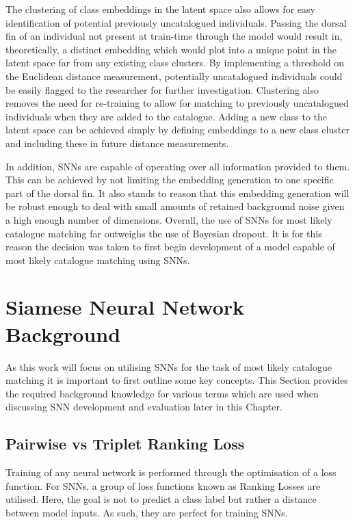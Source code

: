 The clustering of class embeddings in the latent space also allows for easy identification of potential previously uncatalogued individuals. Passing the dorsal fin of an individual not present at train-time through the model would result in, theoretically, a distinct embedding which would plot into a unique point in the latent space far from any existing class clusters. By implementing a threshold on the Euclidean distance measurement, potentially uncatalogued individuals could be easily flagged to the researcher for further investigation. Clustering also removes the need for re-training to allow for matching to previously uncatalogued individuals when they are added to the catalogue. Adding a new class to the latent space can be achieved simply by defining embeddings to a new class cluster and including these in future distance measurements. 

In addition, SNNs are capable of operating over all information provided to them. This can be achieved by not limiting the embedding generation to one specific part of the dorsal fin. It also stands to reason that this embedding generation will be robust enough to deal with small amounts of retained background noise given a high enough number of dimensions. Overall, the use of SNNs for most likely catalogue matching far outweighs the use of Bayesian dropout. It is for this reason the decision was taken to first begin development of a model capable of most likely catalogue matching using SNNs.

\section{Siamese Neural Network Background}\label{ch:ID,sec:SNNBackground}

As this work will focus on utilising SNNs for the task of most likely catalogue matching it is important to first outline some key concepts. This Section provides the required background knowledge for various terms which are used when discussing SNN development and evaluation later in this Chapter.

\subsection{Pairwise vs Triplet Ranking Loss}\label{ch:ID,sec:SNNBackground,sub:lossFunction}

Training of any neural network is performed through the optimisation of a loss function. For SNNs, a group of loss functions known as Ranking Losses are utilised. Here, the goal is not to predict a class label but rather a distance between model inputs. As such, they are perfect for training SNNs. 

